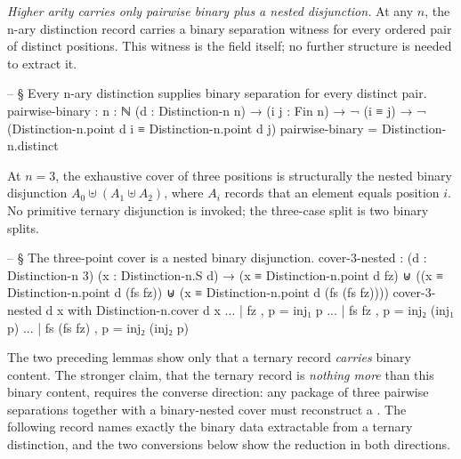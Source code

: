 \documentclass[11pt]{article}
\begin{document}
\emph{Higher arity carries only pairwise binary plus a nested
disjunction.}  At any $n$, the n-ary distinction record carries a
binary separation witness for every ordered pair of distinct
positions.  This witness is the  field itself; no
further structure is needed to extract it.

\begin{code}
-- § Every n-ary distinction supplies binary separation for every distinct pair.
pairwise-binary :
  {n : ℕ} (d : Distinction-n n) →
  (i j : Fin n) → ¬ (i ≡ j) →
  ¬ (Distinction-n.point d i ≡ Distinction-n.point d j)
pairwise-binary = Distinction-n.distinct
\end{code}

At $n=3$, the exhaustive cover of three positions is structurally the
nested binary disjunction $A_0 \uplus (A_1 \uplus A_2)$, where $A_i$
records that an element equals position $i$.  No primitive ternary
disjunction is invoked; the three-case split is two binary splits.

\begin{code}
-- § The three-point cover is a nested binary disjunction.
cover-3-nested :
  (d : Distinction-n 3) (x : Distinction-n.S d) →
  (x ≡ Distinction-n.point d fz)
    ⊎ ((x ≡ Distinction-n.point d (fs fz))
       ⊎ (x ≡ Distinction-n.point d (fs (fs fz))))
cover-3-nested d x with Distinction-n.cover d x
... | fz , p          = inj₁ p
... | fs fz , p       = inj₂ (inj₁ p)
... | fs (fs fz) , p  = inj₂ (inj₂ p)
\end{code}

The two preceding lemmas show only that a ternary record \emph{carries}
binary content.  The stronger claim, that the ternary record is
\emph{nothing more} than this binary content, requires the converse
direction: any package of three pairwise separations together with a
binary-nested cover must reconstruct a 
.  The following record names exactly the binary data
extractable from a ternary distinction, and the two conversions below
show the reduction in both directions.
\end{document}
